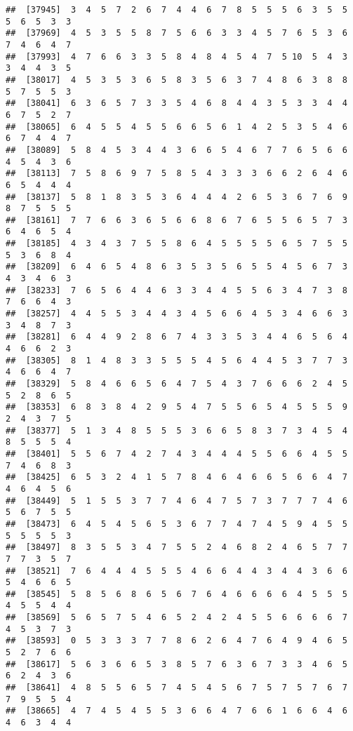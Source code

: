 \documentclass[
]{book}
\begin{document}
\begin{verbatim}
##  [37945]  3  4  5  7  2  6  7  4  4  6  7  8  5  5  5  6  3  5  5  5  6  5  3  3
##  [37969]  4  5  3  5  5  8  7  5  6  6  3  3  4  5  7  6  5  3  6  7  4  6  4  7
##  [37993]  4  7  6  6  3  3  5  8  4  8  4  5  4  7  5 10  5  4  3  3  4  4  3  5
##  [38017]  4  5  3  5  3  6  5  8  3  5  6  3  7  4  8  6  3  8  8  5  7  5  5  3
##  [38041]  6  3  6  5  7  3  3  5  4  6  8  4  4  3  5  3  3  4  4  6  7  5  2  7
##  [38065]  6  4  5  5  4  5  5  6  6  5  6  1  4  2  5  3  5  4  6  6  7  4  4  7
##  [38089]  5  8  4  5  3  4  4  3  6  6  5  4  6  7  7  6  5  6  6  4  5  4  3  6
##  [38113]  7  5  8  6  9  7  5  8  5  4  3  3  3  6  6  2  6  4  6  6  5  4  4  4
##  [38137]  5  8  1  8  3  5  3  6  4  4  4  2  6  5  3  6  7  6  9  8  7  5  5  5
##  [38161]  7  7  6  6  3  6  5  6  6  8  6  7  6  5  5  6  5  7  3  6  4  6  5  4
##  [38185]  4  3  4  3  7  5  5  8  6  4  5  5  5  5  6  5  7  5  5  5  3  6  8  4
##  [38209]  6  4  6  5  4  8  6  3  5  3  5  6  5  5  4  5  6  7  3  4  3  4  6  3
##  [38233]  7  6  5  6  4  4  6  3  3  4  4  5  5  6  3  4  7  3  8  7  6  6  4  3
##  [38257]  4  4  5  5  3  4  4  3  4  5  6  6  4  5  3  4  6  6  3  3  4  8  7  3
##  [38281]  6  4  4  9  2  8  6  7  4  3  3  5  3  4  4  6  5  6  4  4  6  6  2  3
##  [38305]  8  1  4  8  3  3  5  5  5  4  5  6  4  4  5  3  7  7  3  4  6  6  4  7
##  [38329]  5  8  4  6  6  5  6  4  7  5  4  3  7  6  6  6  2  4  5  5  2  8  6  5
##  [38353]  6  8  3  8  4  2  9  5  4  7  5  5  6  5  4  5  5  5  9  2  4  3  7  5
##  [38377]  5  1  3  4  8  5  5  5  3  6  6  5  8  3  7  3  4  5  4  8  5  5  5  4
##  [38401]  5  5  6  7  4  2  7  4  3  4  4  4  5  5  6  6  4  5  5  7  4  6  8  3
##  [38425]  6  5  3  2  4  1  5  7  8  4  6  4  6  6  5  6  6  4  7  4  6  4  5  6
##  [38449]  5  1  5  5  3  7  7  4  6  4  7  5  7  3  7  7  7  4  6  5  6  7  5  5
##  [38473]  6  4  5  4  5  6  5  3  6  7  7  4  7  4  5  9  4  5  5  5  5  5  5  3
##  [38497]  8  3  5  5  3  4  7  5  5  2  4  6  8  2  4  6  5  7  7  7  7  3  5  7
##  [38521]  7  6  4  4  4  5  5  5  4  6  6  4  4  3  4  4  3  6  6  5  4  6  6  5
##  [38545]  5  8  5  6  8  6  5  6  7  6  4  6  6  6  6  4  5  5  5  4  5  5  4  4
##  [38569]  5  6  5  7  5  4  6  5  2  4  2  4  5  5  6  6  6  6  7  4  5  3  7  3
##  [38593]  0  5  3  3  3  7  7  8  6  2  6  4  7  6  4  9  4  6  5  5  2  7  6  6
##  [38617]  5  6  3  6  6  5  3  8  5  7  6  3  6  7  3  3  4  6  5  6  2  4  3  6
##  [38641]  4  8  5  5  6  5  7  4  5  4  5  6  7  5  7  5  7  6  7  7  9  5  5  4
##  [38665]  4  7  4  5  4  5  5  3  6  6  4  7  6  6  1  6  6  4  6  4  6  3  4  4

\end{verbatim}
\end{document}
